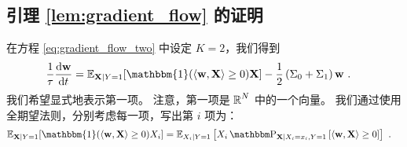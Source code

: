 \subsection{引理 \ref{lem:gradient_flow} 的证明} \label{subsec:pf_of_gradient_flow}
在方程 \eqref{eq:gradient_flow_two} 中设定 $K = 2$，我们得到
\begin{align*}
  \frac{1}{\tau} \frac{\mathrm{d}\mathbf{w}}{\mathrm{d}t}
  &= \E_{\mathbf{X} \mid Y=1}[ \mathbbm{1}( \langle \mathbf{w}, \mathbf{X} \rangle \geq 0 ) \mathbf{X} ] - \frac{1}{2} \left( \Sigma_0 + \Sigma_1 \right) \mathbf{w}~.
\end{align*}
我们希望显式地表示第一项。
注意，第一项是 $\operatorname{\mathbb{R}}^N$ 中的一个向量。
我们通过使用全期望法则，分别考虑每一项，写出第 $i$ 项为：
\begin{align*}
    \E_{\mathbf{X} \mid Y=1}[ \mathbbm{1}( \langle \mathbf{w}, \mathbf{X} \rangle \geq 0 ) X_i ]
    &= \E_{ X_i \mid Y=1 } \left[ X_i \PR_{\mathbf{X} \mid X_i=x_i, Y = 1} \left[  \langle \mathbf{w}, \mathbf{X} \rangle \geq 0 \right] \right]~.
\end{align*}


